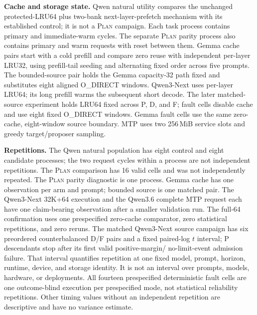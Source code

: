 \documentclass[letterpaper,twocolumn,10pt]{article}
\newcommand{\Plan}{\textsc{Plan}\xspace}
\newcommand{\MiB}{\,MiB\xspace}
\newcommand{\para}[1]{\smallskip\noindent\textbf{#1.}}
\begin{document}
\para{Cache and storage state}
Qwen natural utility compares the unchanged protected-LRU64 plus two-bank
next-layer-prefetch mechanism with its established control; it is not a \Plan
campaign.  Each task process contains primary and immediate-warm cycles.  The
separate \Plan parity process also contains primary and warm requests with reset
between them.  Gemma cache pairs start with a cold prefill and compare zero
reuse with independent per-layer LRU32, using prefill-tail seeding and
alternating fixed order across five prompts.  The bounded-source pair holds the
Gemma capacity-32 path fixed and substitutes eight aligned O\_DIRECT windows.
Qwen3-Next uses per-layer LRU64; its long prefill warms the subsequent short
decode.  The later matched-source experiment holds LRU64 fixed across P, D, and F;
fault cells disable cache and use eight fixed O\_DIRECT windows.  Gemma fault
cells use the same zero-cache, eight-window source boundary.  MTP uses two
256\MiB service slots and greedy target/proposer sampling.

\para{Repetitions}
The Qwen natural population has eight control and eight candidate processes;
the two request cycles within a process are not independent repetitions.  The
\Plan comparison has 16 valid cells and was not independently repeated.  The
\Plan parity diagnostic is one process.  Gemma cache has one observation per
arm and prompt; bounded source is one matched pair.  The Qwen3-Next 32K+64
execution and the Qwen3.6 complete MTP request each have one claim-bearing
observation after a smaller validation run.  The full-64 confirmation uses one
prespecified zero-cache comparator, zero statistical repetitions, and zero
reruns.  The matched Qwen3-Next source
campaign has six preordered counterbalanced D/F pairs and a fixed paired-log
$t$ interval; P descendants stop after its first valid positive-margin/
no-limit-event admission failure.  That
interval quantifies repetition at one fixed model, prompt, horizon, runtime,
device, and storage identity.  It is not an interval over prompts, models,
hardware, or deployments.  All fourteen prespecified deterministic fault
cells are one outcome-blind execution per prespecified mode, not statistical
reliability repetitions.  Other timing values without
an independent repetition are descriptive and have no variance estimate.
\end{document}
